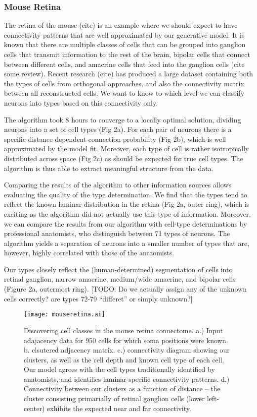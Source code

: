 \documentclass{article}
\begin{document}
\subsubsection{Mouse Retina}
The retina of the mouse (cite) is an example where we should expect to
have connectivity patterns that are well approximated by our
generative model. It is known that there are multiple classes of cells
that can be grouped into ganglion cells that transmit information to
the rest of the brain, bipolar cells that connect between different
cells, and amacrine cells that feed into the ganglion cells (cite some
review). Recent research (cite) has produced a large dataset
containing both the types of cells from orthogonal approaches, and
also the connectivity matrix between all reconstructed cells. We want
to know to which level we can classify neurons into types based on
this connectivity only.

The algorithm took 8 hours to converge to a locally optimal solution,
dividing neurons into a set of cell types (Fig 2a). For each pair of
neurons there is a specific distance dependent connection probability
(Fig 2b), which is well approximated by the model fit. Moreover, each
type of cell is rather isotropically distributed across space (Fig 2c)
as should be expected for true cell types. The algorithm is thus able
to extract meaningful structure from the data.

Comparing the results of the algorithm to other information sources
allows evaluating the quality of the type determination. We find that
the types tend to reflect the known laminar distribution in the retina
(Fig 2a, outer ring), which is exciting as the algorithm did not
actually use this type of information. Moreover, we can compare the
results from our algorithm with cell-type determinations by
professional anatomists, who distinguish between 71 types of
neurons. The algorithm yields a separation of neurons into a smaller
number of types that are, however, highly correlated with those of the
anatomists.

Our types closely reflect the (human-determined) segmentation of cells
into retinal ganglion, narrow amacrine, medium/wide amacrine, and
bipolar cells (Figure 2a, outermost ring). [TODO: Do we actually
assign any of the unknown cells correctly? are types 72-79 “differet”
or simply unknown?]



\begin{figure}
  \centering 
  \centerline{\texttt{[image: mouseretina.ai]}}
  \caption{Discovering cell classes in the mouse retina connectome. 
a.) Input adajacency data for 950 cells for which soma positions were known. b. clsutered adjacency matrix. c.) connectivity diagram showing our clusters, as
well as the cell depth and known cell type of each cell. Our model agrees
with the cell types traditionally identified by anatomists, and identifies 
laminar-specific connectivity patterns. d.) Connectivity between our
clusters as a function of distance -- the cluster consisting primarially of
retinal ganglion cells (lower left-center) exhibits the expected near and
far connectivity.}
\end{figure}
\end{document}

